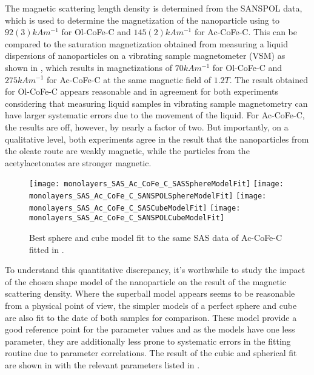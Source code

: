 \documentclass[\main/dresen_thesis.tex]{subfiles}
\begin{document}
    The magnetic scattering length density is determined from the SANSPOL data, which is used to determine the magnetization of the nanoparticle using  to $92(3) \unit{kAm^{-1}}$ for Ol-CoFe-C and $145(2) \unit{kAm^{-1}}$ for Ac-CoFe-C.
    This can be compared to the saturation magnetization obtained from measuring a liquid dispersions of nanoparticles on a vibrating sample magnetometer (VSM) as shown in , which results in magnetizations of $70 \unit{kAm^{-1}}$ for Ol-CoFe-C and $275 \unit{kAm^{-1}}$ for Ac-CoFe-C at the same magnetic field of $1.2 \unit{T}$.
    The result obtained for Ol-CoFe-C appears reasonable and in agreement for both experiments considering that measuring liquid samples in vibrating sample magnetometry can have larger systematic errors due to the movement of the liquid.
    For Ac-CoFe-C, the results are off, however, by nearly a factor of two.
    But importantly, on a qualitative level, both experiments agree in the result that the nanoparticles from the oleate route are weakly magnetic, while the particles from the acetylacetonates are stronger magnetic.

    \begin{figure}[tb]
      \centering
      \texttt{[image: monolayers\_SAS\_Ac\_CoFe\_C\_SASSphereModelFit]}
      \texttt{[image: monolayers\_SAS\_Ac\_CoFe\_C\_SANSPOLSphereModelFit]}
      \texttt{[image: monolayers\_SAS\_Ac\_CoFe\_C\_SASCubeModelFit]}
      \texttt{[image: monolayers\_SAS\_Ac\_CoFe\_C\_SANSPOLCubeModelFit]}
      \caption{\label{fig:monolayers:nanoparticle:sas:SphereCubeFit}Best sphere and cube model fit to the same SAS data of Ac-CoFe-C fitted in .}
    \end{figure}

    To understand this quantitative discrepancy, it's worthwhile to study the impact of the chosen shape model of the nanoparticle on the result of the magnetic scattering density.
    Where the  superball model appears seems to be reasonable from a physical point of view, the simpler models of a perfect sphere and cube are also fit to the date of both samples for comparison.
    These model provide a good reference point for the parameter values and as the models have one less parameter, they are additionally less prone to systematic errors in the fitting routine due to parameter correlations.
    The result of the cubic and spherical fit are shown in  with the relevant parameters listed in .
\end{document}
